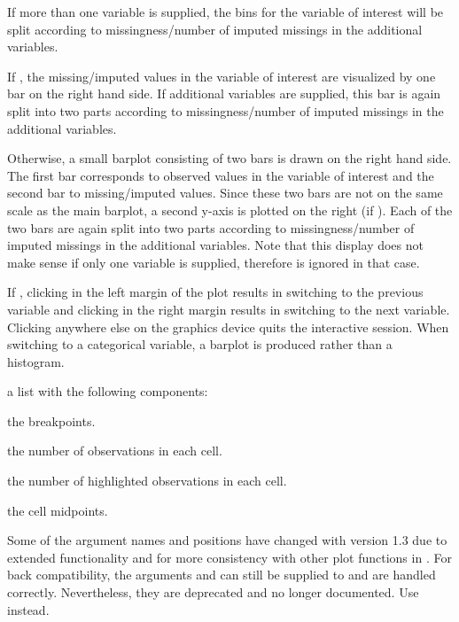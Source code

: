 %
\begin{Details}\relax
If more than one variable is supplied, the bins for the variable of 
interest will be split according to missingness/number of imputed missings in the additional 
variables.

If , the missing/imputed values in the variable of interest 
are visualized by one bar on the right hand side.  If additional variables 
are supplied, this bar is again split into two parts according to 
missingness/number of imputed missings in the additional variables.

Otherwise, a small barplot consisting of two bars is drawn on the right 
hand side.  The first bar corresponds to observed values in the variable 
of interest and the second bar to missing/imputed values.  Since these two bars are 
not on the same scale as the main barplot, a second y-axis is 
plotted on the right (if ).  Each of the two bars are 
again split into two parts according to missingness/number of imputed missings in the additional 
variables.  Note that this display does not make sense if only one 
variable is supplied, therefore  is ignored in that case.

If , clicking in the left margin of the plot 
results in switching to the previous variable and clicking in the right 
margin results in switching to the next variable.  Clicking anywhere 
else on the graphics device quits the interactive session.  When 
switching to a categorical variable, a barplot is produced rather than 
a histogram.
\end{Details}
%
\begin{Value}
a list with the following components:
\begin{ldescription}
\item[\code{breaks}] the breakpoints.
\item[\code{counts}] the number of observations in each cell.
\item[\code{missings}] the number of highlighted observations in each cell.
\item[\code{mids}] the cell midpoints.
\end{ldescription}
\end{Value}
%
\begin{Note}\relax
Some of the argument names and positions have changed with version 1.3 
due to extended functionality and for more consistency with other plot 
functions in .  For back compatibility, the arguments 
 and  can still be supplied to 
 and are handled correctly.  Nevertheless, they are 
deprecated and no longer documented.  Use  instead.
\end{Note}
